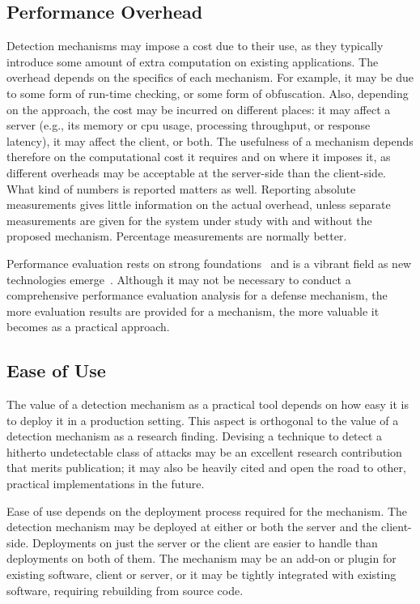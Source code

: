 \documentclass[10pt,journal,compsoc]{IEEEtran}
\begin{document}
\subsection{Performance Overhead}

Detection mechanisms may impose a cost due to their use, as they
typically introduce some amount of extra computation on existing applications.
The overhead depends on the specifics of each mechanism. For
example, it may be due to some form of run-time checking, or some form of
obfuscation. Also, depending on the approach, the cost may be incurred
on different places: it may affect a server
(e.g., its memory or {\sc cpu} usage, processing throughput, or response latency),
it may affect the client, or both. The
usefulness of a mechanism depends therefore on the
computational cost it requires and on where it imposes it, as
different overheads may be acceptable at the server-side than the client-side.
What kind of numbers is reported matters as well. Reporting absolute
measurements gives little information on the actual overhead, unless
separate measurements are given for the system under study with and
without the proposed mechanism. Percentage measurements are normally
better. 

Performance evaluation rests on strong foundations~\cite{jain1991} and
is a vibrant field as new technologies emerge~\cite{gregg2014}.
Although it may not be necessary to conduct a comprehensive
performance evaluation analysis for a defense mechanism, the more
evaluation results are provided for a mechanism, the more valuable
it becomes as a practical approach.

\subsection{Ease of Use}
\label{sec:deployment}

The value of a detection mechanism as a practical tool depends on how
easy it is to deploy it in a production setting. This aspect is
orthogonal to the
value of a detection mechanism as a research finding. Devising a
technique to detect a hitherto undetectable class of attacks may be an
excellent research contribution that merits publication; it may also
be heavily cited and open the road to other, practical
implementations in the future. 

Ease of use depends on the deployment process required for the
mechanism. The detection mechanism may be deployed at either or both
the server and the client-side. Deployments on just the server or the client are
easier to handle than deployments on both of them. The mechanism may
be an add-on or plugin for existing software, client or server, or it
may be tightly integrated with existing software, requiring rebuilding
from source code.
\end{document}
